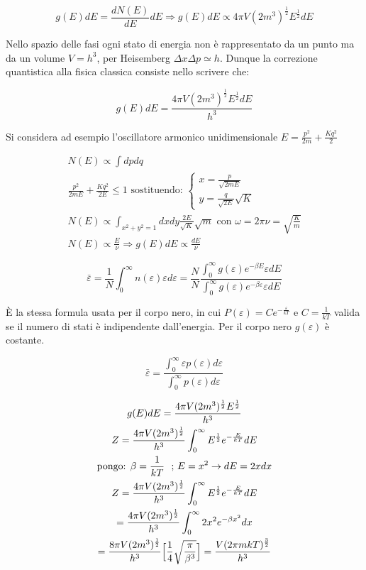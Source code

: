 $$  g(E)dE = \frac{dN(E)}{dE}dE \Rightarrow g(E)dE \propto 4 \pi V (2m^3)^{\frac{1}{2}} E^{\frac{1}{2}} dE $$

Nello spazio delle fasi ogni stato di energia non è rappresentato da un punto ma da un volume $V = h^3$, per Heisemberg $\Delta x \Delta p \simeq h$.
Dunque la correzione quantistica alla fisica classica consiste nello scrivere che:


\begin{equation}\label{ge_de}
g(E) dE = \frac{4 \pi V (2m^3)^{\frac{1}{2}} E^{\frac{1}{2}} dE}{h^3}
\end{equation}


Si considera ad esempio l'oscillatore armonico unidimensionale $ E = \frac{p^2}{2m} + \frac{K q^2}{2} $

\begin{gather*} 
N(E) \propto \int dp dq \\
\frac{p^2}{2mE} + \frac{K q^2}{2E} \leq 1 \mbox{ sostituendo: } 
\begin{cases}
	x = \frac{p}{\sqrt{2mE}} \\
	y = \frac{q}{\sqrt{2E}} \sqrt{K}
\end{cases} \\
N(E) \propto \int_{x^2 + y^2 = 1} dx dy \frac{2E}{\sqrt{K}} \sqrt{m}  \mbox{ con } \omega = 2 \pi \nu = \sqrt{\frac{K}{m}} \\
N(E) \propto \frac{E}{\nu} \Rightarrow g(E)dE \propto \frac{dE}{\nu}
\end{gather*} 

$$ \bar\varepsilon =  \frac{1}{N} \int_0^{\infty} n(\varepsilon) \varepsilon d\varepsilon = \frac{N}{N} \frac{\int_0^{\infty} g(\varepsilon) e^{- \beta E} \varepsilon dE}{\int_0^{\infty} g(\varepsilon) e^{- \beta \varepsilon} \varepsilon dE }$$

È la stessa formula usata per il corpo nero, in cui $P(\varepsilon) = C e^{- \frac{\varepsilon}{k T}} $ e $ C = \frac{1}{k T}$ valida se il numero di stati è indipendente dall'energia. Per il corpo nero $g(\varepsilon)$ è costante.

$$ \bar\varepsilon =   \frac{\int_0^{\infty} \varepsilon p(\varepsilon) d \varepsilon}{\int_0^{\infty} p(\varepsilon) d \varepsilon}$$

\begin{gather*} \label{fun_partizione}
g(E)dE = \frac{4 \pi V (2m^3)^\frac{1}{2}  E^\frac{1}{2} }{ h^3 } \\
Z =  \frac{4 \pi V (2m^3)^\frac{1}{2} }{ h^3 }  \int_0^{\infty}  E^\frac{1}{2} e^{- \frac{E}{k T}}  dE \\
\mbox{pongo: } \beta = \frac{1}{k T} \mbox{ \space ;  }  E = x^2  \rightarrow dE = 2x dx \\
Z =  \frac{4 \pi V (2m^3)^\frac{1}{2} }{ h^3 }  \int_0^{\infty}  E^\frac{1}{2} e^{- \frac{E}{k T}}  dE \\
= \frac{4 \pi V (2m^3)^\frac{1}{2} }{ h^3 } \int_0^{\infty} 2x^2 e^{- \beta x^2 } dx \\
= \frac{8 \pi V (2m^3)^\frac{1}{2} }{ h^3 } \Bigl[  \frac{1}{4} \sqrt{\frac{\pi}{\beta^3}}  \Bigr] 
= \frac{V (2 \pi m k T)^\frac{3}{2}}{h^3}
\end{gather*}

